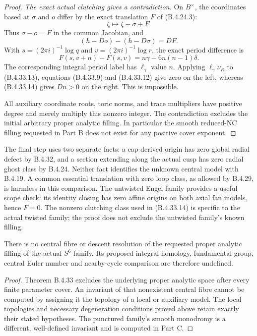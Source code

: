 \begin{proof}
\emph{The exact actual clutching gives a contradiction.}
On $B^\times$, the coordinates based at
$\sigma$ and $o$ differ by the exact
translation $F$ of (B.4.24.3):
\[
 \zeta\longmapsto\zeta-\sigma+F.
\]
Thus $\sigma-o=F$ in the common Jacobian,
and
\[
 (h-D o)-(h-D\sigma)=D F.
 \tag{B.4.33.13}
\]
With $s=(2\pi i)^{-1}\log q$ and
$v=(2\pi i)^{-1}\log r$, the exact
period difference is
\[
 F(s,v+n)-F(s,v)
       =n\gamma-6n(n-1)\delta.
 \tag{B.4.33.14}
\]
The corresponding integral period label
has $\ell_\gamma$ value $n$.
Applying $\ell_\gamma\nu_R$ to
(B.4.33.13), equations (B.4.33.9) and
(B.4.33.12) give zero on the left,
whereas (B.4.33.14) gives $Dn>0$ on
the right. This is impossible.

All auxiliary coordinate roots, toric
norms, and trace multipliers have positive
degree and merely multiply this nonzero
integer. The contradiction excludes the
initial arbitrary proper analytic filling.
In particular the smooth reduced-NC
filling requested in Part B does not
exist for any positive cover exponent.
\end{proof}

The final step uses two separate facts: a
cap-derived origin has zero global radial
defect by B.4.32, and a section extending
along the actual cusp has zero radial
ghost class by B.4.24. Neither fact
identifies the unknown central model with
B.4.19. A common essential translation
with zero loop class, as allowed by
B.4.29, is harmless in this comparison.
The untwisted Engel family provides a
useful scope check: its identity closing
has zero affine origins on both axial
fan models, hence $F=0$. The nonzero
clutching class used in (B.4.33.14)
is specific to the actual twisted
family; the proof does not exclude
the untwisted family's known filling.


\begin{corollary}\label{push:src:B.5.1}\label{push:B51}
There is no central fibre or descent resolution
of the requested proper analytic filling of the
actual $S^6$ family. Its proposed integral homology,
fundamental group, central Euler number and
nearby-cycle comparison are therefore undefined.
\end{corollary}
\begin{proof}
Theorem B.4.33 excludes the underlying proper
analytic space after every finite parameter cover.
An invariant of that nonexistent central fibre
cannot be computed by assigning it the topology
of a local or auxiliary model. The local topologies
and necessary degeneration conditions proved above
retain exactly their stated hypotheses. The
punctured family's smooth monodromy is a different,
well-defined invariant and is computed in Part C.
\end{proof}

